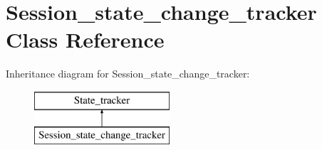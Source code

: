 \hypertarget{classSession__state__change__tracker}{}\section{Session\+\_\+state\+\_\+change\+\_\+tracker Class Reference}
\label{classSession__state__change__tracker}
Inheritance diagram for Session\+\_\+state\+\_\+change\+\_\+tracker\+:\begin{figure}[H]
\begin{center}
\leavevmode
\includegraphics[height=2.000000cm]{classSession__state__change__tracker}
\end{center}
\end{figure}
